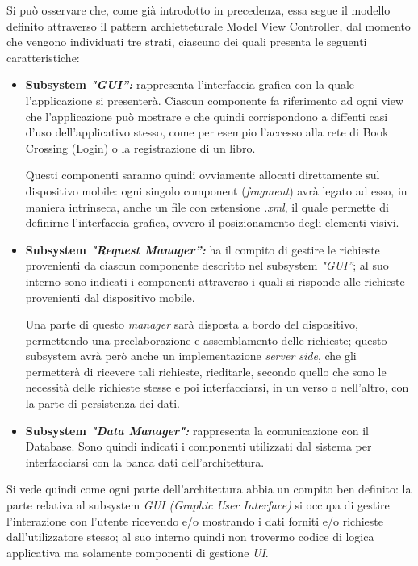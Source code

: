 Si può osservare che, come già introdotto in precedenza, essa segue il modello definito attraverso il pattern archietteturale Model View Controller, dal momento che vengono individuati tre strati, ciascuno dei quali presenta le seguenti caratteristiche:
\begin{itemize}
	\item\label{subsysGUI} \textbf{Subsystem \textit{"GUI”:}} rappresenta l’interfaccia grafica con la quale l’applicazione si presenterà. Ciascun componente fa riferimento ad ogni view che l'applicazione può mostrare e che quindi corrispondono a diffenti casi d'uso dell'applicativo stesso, come per esempio l’accesso alla rete di Book Crossing (Login) o la registrazione di un libro.
	
	Questi componenti saranno quindi ovviamente allocati direttamente sul dispositivo mobile: ogni singolo component (\textit{fragment}) avrà legato ad esso, in maniera intrinseca, anche un file con estensione \textit{.xml}, il quale permette di definirne l'interfaccia grafica, ovvero il posizionamento degli elementi visivi.
	\newpage
	\item\label{subsysRequestManager} \textbf{Subsystem \textit{"Request Manager”:}} ha il compito di gestire le richieste provenienti da ciascun componente descritto nel subsystem \textit{"GUI”}; al suo interno sono indicati i componenti attraverso i quali si risponde alle richieste provenienti dal dispositivo mobile.
	
	Una parte di questo \textit{manager} sarà disposta a bordo del dispositivo, permettendo una preelaborazione e assemblamento delle richieste; questo subsystem avrà però anche un implementazione \textit{server side}, che gli permetterà di ricevere tali richieste, rieditarle, secondo quello che sono le necessità delle richieste stesse e poi interfacciarsi, in un verso o nell'altro, con la parte di persistenza dei dati.
	
	\item\label{subsysDataManager} \textbf{Subsystem \textit{"Data Manager":}} rappresenta la comunicazione con il Database. Sono quindi indicati i componenti utilizzati dal sistema per interfacciarsi con la banca dati dell’architettura.
\end{itemize}

Si vede quindi come ogni parte dell'architettura abbia un compito ben definito: la parte relativa al subsystem \textit{GUI (Graphic User Interface)} si occupa di gestire l'interazione con l'utente ricevendo e/o mostrando i dati forniti e/o richieste dall'utilizzatore stesso; al suo interno quindi non trovermo codice di logica applicativa ma solamente componenti di gestione \textit{UI}.


